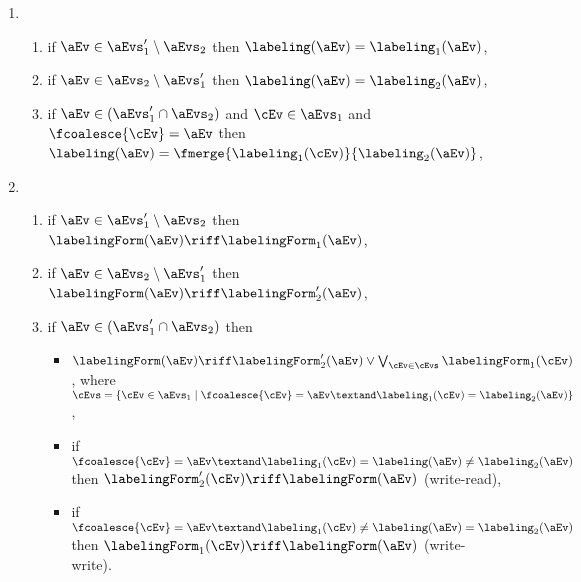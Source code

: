 \begin{enumerate}[topsep=0pt,label=(\textsc{s}\arabic*),ref=\textsc{s}\arabic*]
\item[] \setcounter{enumi}{\value{lambda}} 
  \begin{enumerate}[leftmargin=0pt]
  \item \label{seq-lambda-merge1}
    if $\aEv\in\aEvs_1'\setminus\aEvs_2$ then $\labeling(\aEv)=\labeling_1(\aEv)$,
  \item \label{seq-lambda-merge2}
    if $\aEv\in\aEvs_2\setminus\aEvs_1'$ then $\labeling(\aEv)=\labeling_2(\aEv)$,
  \item \label{seq-lambda-merge12}
    if $\aEv\in(\aEvs_1'\cap\aEvs_2)$ and $\cEv\in\aEvs_1$ and $\fcoalesce{\cEv}=\aEv$ then
    $\labeling(\aEv)= \fmerge{\labeling_1(\cEv)}{\labeling_2(\aEv)}$,
  \end{enumerate}
\item[] \setcounter{enumi}{\value{kappa}} 
  \begin{enumerate}[leftmargin=0pt]
  \item \label{seq-kappa-merge1}
    if $\aEv\in\aEvs_1'\setminus\aEvs_2$ then $\labelingForm(\aEv) \riff \labelingForm_1(\aEv)$,
  \item \label{seq-kappa-merge2}
    if $\aEv\in\aEvs_2\setminus\aEvs_1'$ then $\labelingForm(\aEv) \riff \labelingForm'_2(\aEv)$,
  \item \label{seq-kappa-merge12}
    if $\aEv\in(\aEvs_1'\cap\aEvs_2)$ then
    \begin{itemize}
    \item $\labelingForm(\aEv) \riff \labelingForm'_2(\aEv) \lor \bigvee_{\cEv\in\cEvs}\labelingForm_1(\cEv)$,
      where $\cEvs=\{\cEv\in\aEvs_1\mid \fcoalesce{\cEv}=\aEv \textand \labeling_1(\cEv)=\labeling_2(\aEv)\}$,
    \item if $\fcoalesce{\cEv}=\aEv \textand \labeling_1(\cEv)=\labeling(\aEv)\neq\labeling_2(\aEv)$ then
      $\labelingForm_2'(\cEv) \riff \labelingForm(\aEv)$ (write-read),
    \item if $\fcoalesce{\cEv}=\aEv \textand \labeling_1(\cEv)\neq\labeling(\aEv)=\labeling_2(\aEv)$ then
      $\labelingForm_1(\cEv) \riff \labelingForm(\aEv)$ (write-write).
    \end{itemize}
  \end{enumerate}
\end{enumerate}



